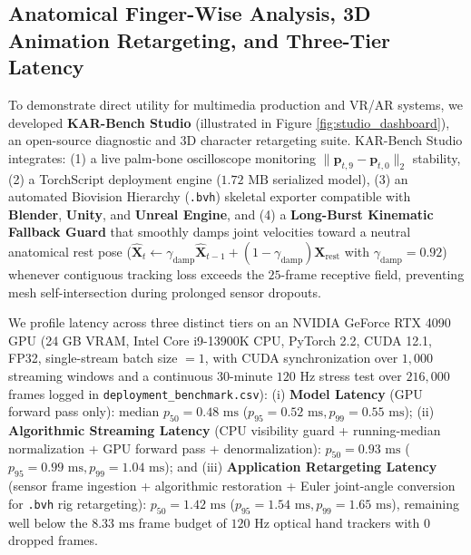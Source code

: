 \documentclass[10pt,twocolumn]{article}
\begin{document}
\subsection{Anatomical Finger-Wise Analysis, 3D Animation Retargeting, and Three-Tier Latency}
To demonstrate direct utility for multimedia production and VR/AR systems, we developed \textbf{KAR-Bench Studio} (illustrated in Figure \ref{fig:studio_dashboard}), an open-source diagnostic and 3D character retargeting suite. KAR-Bench Studio integrates: (1) a live palm-bone oscilloscope monitoring $\|\mathbf{p}_{t,9} - \mathbf{p}_{t,0}\|_2$ stability, (2) a TorchScript deployment engine ($1.72\text{ MB}$ serialized model), (3) an automated Biovision Hierarchy (\texttt{.bvh}) skeletal exporter compatible with \textbf{Blender}, \textbf{Unity}, and \textbf{Unreal Engine}, and (4) a \textbf{Long-Burst Kinematic Fallback Guard} that smoothly damps joint velocities toward a neutral anatomical rest pose ($\hat{\mathbf{X}}_t \leftarrow \gamma_{\text{damp}}\hat{\mathbf{X}}_{t-1} + (1-\gamma_{\text{damp}})\mathbf{X}_{\text{rest}}$ with $\gamma_{\text{damp}}=0.92$) whenever contiguous tracking loss exceeds the $25$-frame receptive field, preventing mesh self-intersection during prolonged sensor dropouts.

We profile latency across three distinct tiers on an NVIDIA GeForce RTX 4090 GPU (24 GB VRAM, Intel Core i9-13900K CPU, PyTorch 2.2, CUDA 12.1, FP32, single-stream batch size $= 1$, with CUDA synchronization over $1,000$ streaming windows and a continuous 30-minute $120\text{ Hz}$ stress test over $216,000$ frames logged in \texttt{deployment\_benchmark.csv}): (i) \textbf{Model Latency} (GPU forward pass only): median $p_{50} = 0.48\text{ ms}$ ($p_{95} = 0.52\text{ ms}, p_{99} = 0.55\text{ ms}$); (ii) \textbf{Algorithmic Streaming Latency} (CPU visibility guard + running-median normalization + GPU forward pass + denormalization): $p_{50} = 0.93\text{ ms}$ ($p_{95} = 0.99\text{ ms}, p_{99} = 1.04\text{ ms}$); and (iii) \textbf{Application Retargeting Latency} (sensor frame ingestion + algorithmic restoration + Euler joint-angle conversion for \texttt{.bvh} rig retargeting): $p_{50} = 1.42\text{ ms}$ ($p_{95} = 1.54\text{ ms}, p_{99} = 1.65\text{ ms}$), remaining well below the $8.33\text{ ms}$ frame budget of $120\text{ Hz}$ optical hand trackers with $0$ dropped frames.
\end{document}
